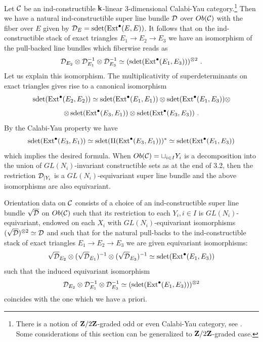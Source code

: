 \documentclass[12pt]{article}
\begin{document}
Let ${\mathcal C}$ be an ind-constructible ${\bf k}$-linear $3$-dimensional Calabi-Yau category.\footnote{There is a notion of ${\bf Z}/2{\bf Z}$-graded odd or even Calabi-Yau category, see \cite{KoSo3}. Some considerations of this section can be generalized to ${\bf Z}/2{\bf Z}$-graded case.}
Then we have a natural ind-constructible super line bundle ${\cal D}$ over $Ob({\mathcal C})$ with the fiber over $E$ given by
${\cal D}_E=\operatorname{sdet}(\operatorname{Ext}^{\bullet}(E,E))$. It follows that on the ind-constructible stack of exact triangles $E_1\to E_2\to E_3$ we have an isomorphism of the pull-backed line bundles which fiberwise reads as
$${\cal D}_{E_2}\otimes {\cal D}_{E_1}^{-1}\otimes {\cal D}_{E_3}^{-1}\simeq (\operatorname{sdet}(\operatorname{Ext}^{\bullet}(E_1,E_3)))^{\otimes 2}\,\,.$$
Let us explain this isomorphism. The multiplicativity of superdeterminants on exact triangles gives rise to a canonical isomorphism
$$\operatorname{sdet}(\operatorname{Ext}^{\bullet}(E_2,E_2))\simeq \operatorname{sdet}(\operatorname{Ext}^{\bullet}(E_1,E_1))\otimes \operatorname{sdet}(\operatorname{Ext}^{\bullet}(E_1,E_3))\otimes $$
$$\otimes\operatorname{sdet}(\operatorname{Ext}^{\bullet}(E_3,E_1))\otimes \operatorname{sdet}(\operatorname{Ext}^{\bullet}(E_3,E_3))\,\,.$$
By the Calabi-Yau property we have
$$\operatorname{sdet}(\operatorname{Ext}^{\bullet}(E_3,E_1))\simeq \operatorname{sdet}(\Pi(\operatorname{Ext}^{\bullet}(E_3,E_1)))^{\ast}\simeq \operatorname{sdet}(\operatorname{Ext}^{\bullet}(E_1,E_3))$$
which implies the desired formula.
When $Ob({\mathcal C})=\sqcup_{i\in I}Y_i$ is a decomposition into the union of $GL(N_i)$-invariant constructible sets as at the end of 3.2, then the restriction ${\cal D}_{|Y_i}$ is a $GL(N_i)$-equivariant super line bundle and the above isomorphisms are also equivariant.

\begin{defn} Orientation data on ${\mathcal C}$ consists of a choice of an ind-constructible super line bundle $\sqrt{{\cal D}}$ on $Ob({\mathcal C})$ such that its restriction to each $Y_i, i\in I$ is $GL(N_i)$-equivariant, endowed on each $X_i$ with $GL(N_i)$-equivariant isomorphisms $(\sqrt{{\cal D}})^{\otimes 2}\simeq {\cal D}$ and such that for the natural pull-backs to the ind-constructible stack of exact triangles $E_1\to E_2\to E_3$ we are given equivariant isomorphisms:
$$\sqrt{{\cal D}}_{E_2}\otimes (\sqrt{{\cal D}}_{E_1})^{-1}\otimes (\sqrt{{\cal D}}_{E_3})^{-1}\simeq \operatorname{sdet}(\operatorname{Ext}^{\bullet}(E_1,E_3))$$
such that the induced equivariant isomorphism
$${\cal D}_{E_2}\otimes {\cal D}_{E_1}^{-1}\otimes {\cal D}_{E_3}^{-1}\simeq (\operatorname{sdet}(\operatorname{Ext}^{\bullet}(E_1,E_3)))^{\otimes 2}$$
coincides  with the one which we have a priori.



\end{defn}
\end{document}
